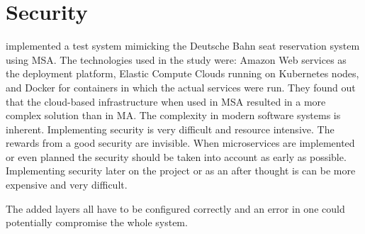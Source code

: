\section{Security}
\begin{sloppypar}
    \citet{secconmsa} implemented a test system mimicking the Deutsche Bahn 
    seat reservation system using MSA. The technologies used in the study were: 
    Amazon Web services as the deployment platform, Elastic Compute Clouds 
    running on Kubernetes nodes, and Docker for containers in which the actual 
    services were run. They found out that the cloud-based infrastructure when 
    used in MSA resulted in a more complex solution than in MA. The complexity 
    in modern software systems is inherent. Implementing security is very 
    difficult and resource intensive. The rewards from a good security are 
    invisible. When microservices are implemented or even planned the security 
    should be taken into account as early as possible. Implementing security 
    later on the project or as an after thought is can be more expensive and 
    very difficult.
\end{sloppypar}
\begin{sloppypar}
    The added layers all have to be configured correctly and an error in one 
    could potentially compromise the whole system. 
\end{sloppypar}

